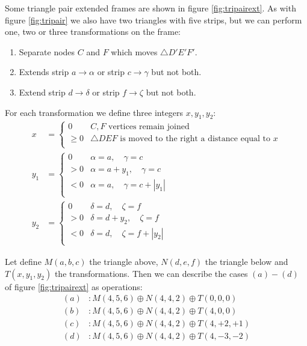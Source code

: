 \documentclass[11pt]{article}
\begin{document}
Some triangle pair extended frames are shown in figure \ref{fig:tripairext}.
As with figure \ref{fig:tripair} we also have two triangles with five strips,
but we can perform one, two or three transformations on the frame: 
\begin{enumerate}
 \item Separate nodes $C$ and $F$ which moves $\triangle{D'E'F'}$.
 \item Extends strip $a \rightarrow \alpha$ or strip $c \rightarrow \gamma$ but not both.
 \item Extend strip $d \rightarrow \delta$ or strip $f \rightarrow \zeta$ but not both.
\end{enumerate}

For each transformation we define three integers $x, y_1, y_2$:
\begin{align}
x &= \left \{ \begin{array}{rl}
 0       &  C,F \mbox{ vertices remain joined}\\
 \geq  0 &  \triangle{DEF} \mbox{ is moved to the right a distance equal to } x \\
 \end{array}\right. \\
y_1 &= \left \{ \begin{array}{rl}
 0   & \alpha = a,\quad \gamma = c \\
 > 0 & \alpha = a + y_1,\quad \gamma = c \\
 < 0 & \alpha = a,\quad \gamma = c + |y_1| \\
 \end{array}\right. \\ 
y_2 &= \left \{ \begin{array}{rl}
 0   & \delta = d,\quad \zeta = f \\
 > 0 & \delta = d + y_2,\quad \zeta = f \\
 < 0 & \delta = d,\quad \zeta = f + |y_2| \\
 \end{array}\right. 
\end{align}

Let define $M(a,b,c)$ the triangle above, $N(d,e,f)$ the triangle below and $T(x,y_1,y_2)$ the transformations.
Then we can describe the cases $(a)-(d)$ of figure \ref{fig:tripairext} as operations:
\begin{align*}
(a) &: M(4,5,6) \oplus N(4,4,2) \oplus T(0,0,0) \\
(b) &: M(4,5,6) \oplus N(4,4,2) \oplus T(4,0,0) \\
(c) &: M(4,5,6) \oplus N(4,4,2) \oplus T(4,+2,+1) \\
(d) &: M(4,5,6) \oplus N(4,4,2) \oplus T(4,-3,-2)
\end{align*}
\end{document}
